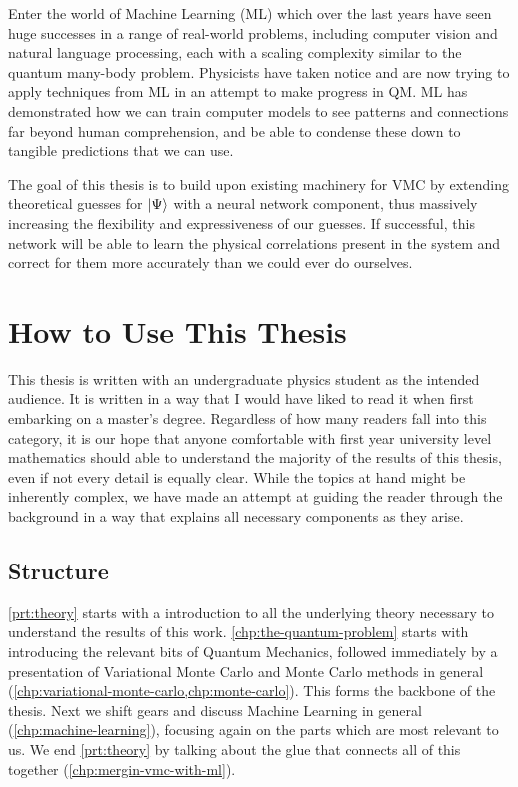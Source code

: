 \documentclass[Thesis.tex]{subfiles}
\begin{document}
Enter the world of Machine Learning (ML) which over the last years have seen
huge successes in a range of real-world problems, including computer vision and
natural language processing, each with a scaling complexity similar to
the quantum many-body problem. Physicists have taken notice and are now trying
to apply techniques from ML in an attempt to make progress in QM. ML has
demonstrated how we can train computer models to see patterns and connections
far beyond human comprehension, and be able to condense these down to tangible
predictions that we can use.

The goal of this thesis is to build upon existing machinery for VMC by extending
theoretical guesses for $| \Psi \rangle$ with a neural network component, thus massively
increasing the flexibility and expressiveness of our guesses. If successful, this
network will be able to learn the physical correlations present in the system
and correct for them more accurately than we could ever do ourselves.



\section{How to Use This Thesis}

This thesis is written with an undergraduate physics student as the intended
audience. It is written in a way that I would have liked to read it when first
embarking on a master's degree. Regardless of how many readers fall into this
category, it is our hope that anyone comfortable with first year university
level mathematics should able to understand the majority of the results of this
thesis, even if not every detail is equally clear. While the topics at hand might be
inherently complex, we have made an attempt at guiding the reader through the
background in a way that explains all necessary components as they arise.


\subsection{Structure}
\cref{prt:theory} starts with a introduction to all the underlying theory
necessary to understand the results of this work. \cref{chp:the-quantum-problem}
starts with introducing the relevant bits of Quantum Mechanics, followed
immediately by a presentation of Variational Monte Carlo and Monte Carlo methods
in general (\cref{chp:variational-monte-carlo,chp:monte-carlo}). This forms the
backbone of the thesis. Next we shift gears and discuss Machine Learning in
general (\cref{chp:machine-learning}), focusing again on the parts which are
most relevant to us. We end \cref{prt:theory} by talking about the glue that
connects all of this together (\cref{chp:mergin-vmc-with-ml}).
\end{document}
